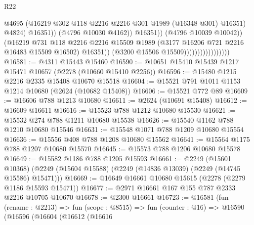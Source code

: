 \begin{lexlean}{R22}
\begin{coremodule}
                                                    @4695
                                                    (@16219
                                                      @302
                                                      @118
                                                      @2216
                                                      @2216
                                                      @301
                                                      @1989
                                                      (@16348 @301)
                                                      @16351)
                                                    @4824)
                                                  @16351))
                                              (@4796 @10030 @4162))
                                            @16351))
                                        (@4796 @10039 @10042))
                                      (@16219
                                        @731
                                        @118
                                        @2216
                                        @2216
                                        @15509
                                        @1989
                                        (@3177 @16206 @721 @2216 @16483 @15509 @16502)
                                        @16351))
                                    (@3200 @15506 @15509)))))))))))))))))
@16581 := @4311 @15443 @15460
@16590 := @10651 @15410 @15439 @1217 @15471 @10657 (@2278 (@10660 @15410 @2256))
@16596 := @15480 @1215 @2216 @2335 @15408 @10670 @15518
@16604 := @15521 @791 @1011 @1153 @1214 @10680 (@2624 (@10682 @15408))
@16606 := @15521 @772 @89
@16609 := @16606 @788 @1213 @10680
@16611 := @2624 (@10691 @15408)
@16612 := @16609 @16611
@16616 := @15523 @788 @1212 @10680 @15530
@16621 := @15532 @274 @788 @1211 @10680 @15538
@16626 := @15540 @1162 @788 @1210 @10680 @15546
@16631 := @15548 @1071 @788 @1209 @10680 @15554
@16636 := @15556 @408 @788 @1208 @10680 @15562
@16641 := @15564 @1175 @788 @1207 @10680 @15570
@16645 := @15573 @788 @1206 @10680 @15578
@16649 := @15582 @1186 @788 @1205 @15593
@16661 := @2249
    (@15601 @10368)
    (@2249 (@15604 @15588) (@2249 (@14836 @13039) (@2249 (@14745 @15586) @15471)))
@16669 := @16649 @16661 @10680 @15615 (@2278 (@2279 @1186 @15593 @15471))
@16677 := @2971 @16661 @167 @155 @787 @2333 @2216 @10705 @10670
@16678 := @2300 @16661
@16723 := @16581
    (fun (rename : @2213) =>
    fun (scope : @8515) =>
    fun (counter : @16) =>
    @16590
      (@16596
        (@16604
          (@16612
            (@16616

\end{coremodule}
\end{lexlean}
